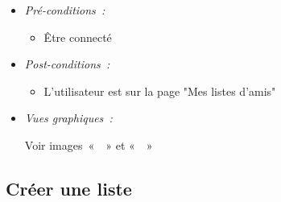 \begin{itemize}
\item \textit{Pré-conditions~:}

    \begin{itemize}
        \item Être connecté
    \end{itemize}

\item \textit{Post-conditions~:}
    \begin{itemize}
        \item L'utilisateur est sur la page "Mes listes d'amis"
    \end{itemize}
    
    \item \textit{Vues graphiques~:}
    
    Voir images~«~~» et 
«~~»

\end{itemize}

\subsection{Créer une liste}\label{subsec:creer-une-liste}

